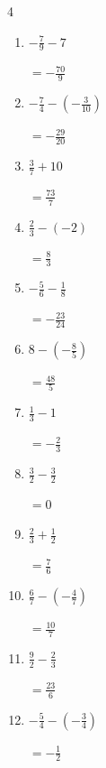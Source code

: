 \begin{multicols}{4}
\begin{enumerate}
        $\displaystyle =-\frac{31}{6}$

  \item $\displaystyle -\frac{7}{9} - 7$

        $\displaystyle =-\frac{70}{9}$

  \item $\displaystyle -\frac{7}{4} - \left(-\frac{3}{10}\right)$

        $\displaystyle =-\frac{29}{20}$

  \item $\displaystyle \frac{3}{7} + 10$

        $\displaystyle =\frac{73}{7}$

\columnbreak %

  \item $\displaystyle \frac{2}{3} - \left(-2\right)$

        $\displaystyle =\frac{8}{3}$

  \item $\displaystyle -\frac{5}{6} - \frac{1}{8}$

        $\displaystyle =-\frac{23}{24}$

  \item $\displaystyle 8 - \left(-\frac{8}{5}\right)$

        $\displaystyle =\frac{48}{5}$

  \item $\displaystyle \frac{1}{3} - 1$

        $\displaystyle =-\frac{2}{3}$

  \item $\displaystyle \frac{3}{2} - \frac{3}{2}$

        $\displaystyle =0$

  \item $\displaystyle \frac{2}{3} + \frac{1}{2}$

        $\displaystyle =\frac{7}{6}$

  \item $\displaystyle \frac{6}{7} - \left(-\frac{4}{7}\right)$

        $\displaystyle =\frac{10}{7}$

  \item $\displaystyle \frac{9}{2} - \frac{2}{3}$

        $\displaystyle =\frac{23}{6}$

  \item $\displaystyle -\frac{5}{4} - \left(-\frac{3}{4}\right)$

        $\displaystyle =-\frac{1}{2}$


\end{enumerate}
\end{multicols}
